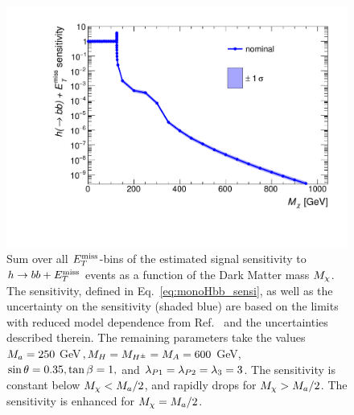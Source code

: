 \begin{figure}[tbp]
\centering
\includegraphics[width=\textwidth]{texinputs/04_grid/figures/monoHbb_sensi_mDM_scan.pdf}
\caption[Sensitivity to $h\rightarrow bb + \MET$ signals with different $\mDM$, summed across $\MET$ bins]
{
Sum over all $\MET$-bins of the estimated signal sensitivity to $h\rightarrow bb + \MET$ events as a function of the Dark Matter mass $\mDM$. 
The sensitivity, defined in Eq.~\ref{eq:monoHbb_sensi}, as well as the uncertainty on the sensitivity (shaded blue)
are based on the limits with reduced model dependence from Ref.~\cite{Aaboud:2017yqz} and the uncertainties described therein. 
The remaining parameters take the values
$ M_{a} = 250 $ GeV$, M_{H}=M_{H^{\pm}}=M_{A} = 600$ GeV, $ \sin\theta = 0.35, \tan\beta = 1,$ and $ \lambda_{P1} = \lambda_{P2} = \lambda_{3} = 3 $. 
The sensitivity is constant below $M_{\chi} < M_{a}/2$, and rapidly drops for $M_{\chi} > M_{a}/2$. The sensitivity is enhanced for $M_{\chi} = M_{a}/2$.}
\label{fig:monoHbb_sensi_full_mDM}
\end{figure}

